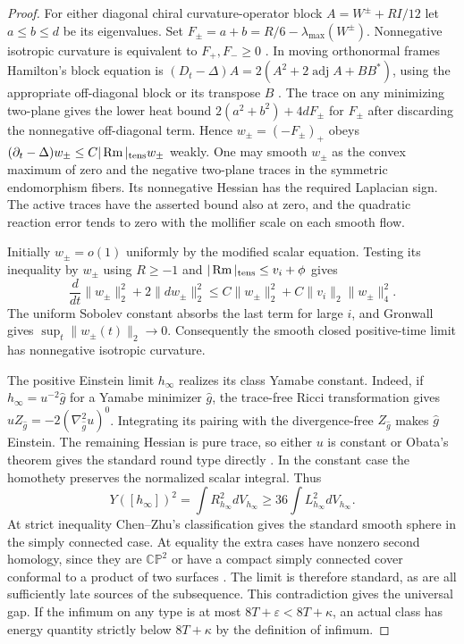 \begin{proof}
For either diagonal chiral curvature-operator block
\(A=W^\pm+RI/12\) let \(a\le b\le d\) be its eigenvalues.
Set \(F_\pm=a+b=R/6-\lambda_{\max}(W^\pm)\). Nonnegative
isotropic curvature is equivalent to \(F_+,F_-\ge0\)
\cite[Section~3, (3.1)--(3.2)]{ChenZhu2014Conformal}.
In moving orthonormal frames Hamilton's block equation is
\((D_t-\Delta)A=2(A^2+2\operatorname{adj}A+BB^*)\), using
the appropriate off-diagonal block or its transpose \(B\)
\cite[Section~2, pp.~157--158]{Hamilton1986}.
The trace on any minimizing two-plane gives the lower heat
bound \(2(a^2+b^2)+4dF_\pm\) for \(F_\pm\) after discarding
the nonnegative off-diagonal term. Hence \(w_\pm=(-F_\pm)_+\)
obeys \((\partial_t-\Delta)w_\pm\le C|\operatorname{Rm}|_{\rm tens}w_\pm\)
weakly. One may smooth \(w_\pm\) as the convex maximum of zero
and the negative two-plane traces in the symmetric endomorphism
fibers. Its nonnegative Hessian has the required Laplacian sign.
The active traces have the asserted bound also at zero, and
the quadratic reaction error tends to zero with the mollifier
scale on each smooth flow.

Initially \(w_\pm=o(1)\) uniformly by the modified scalar
equation. Testing its inequality by \(w_\pm\) using \(R\ge-1\)
and \(|\operatorname{Rm}|_{\rm tens}\le v_i+\phi\) gives
\[
 \frac d{dt}\|w_\pm\|_2^2+2\|dw_\pm\|_2^2
 \le C\|w_\pm\|_2^2+C\|v_i\|_2\|w_\pm\|_4^2.
\]
The uniform Sobolev constant absorbs the last term for large
\(i\), and Gronwall gives \(\sup_t\|w_\pm(t)\|_2\to0\).
Consequently the smooth closed positive-time limit has
nonnegative isotropic curvature.

The positive Einstein limit \(h_\infty\) realizes its class Yamabe
constant. Indeed, if \(h_\infty=u^{-2}\widehat g\) for a Yamabe
minimizer \(\widehat g\), the trace-free Ricci transformation gives
\(u Z_{\widehat g}=-2(\nabla^2_{\widehat g}u)^0\). Integrating its
pairing with the divergence-free \(Z_{\widehat g}\) makes \(\widehat g\)
Einstein. The remaining Hessian is pure trace, so either \(u\) is
constant or Obata's theorem gives the standard round type directly
\cite{Obata1962Sphere}. In the constant case the homothety
preserves the normalized scalar integral. Thus
\[
 Y([h_\infty])^2=\int R_{h_\infty}^2dV_{h_\infty}
 \ge36\int L_{h_\infty}^2dV_{h_\infty}.
\]
At strict inequality Chen--Zhu's classification gives the
standard smooth sphere in the simply connected case. At equality
the extra cases have nonzero second homology, since they are
\(\mathbb{CP}^2\) or have a compact simply connected cover
conformal to a product of two surfaces
\cite[Theorems~1.4 and 1.6]{ChenZhu2014Conformal}. The limit is
therefore standard, as are all sufficiently late sources of the
subsequence. This contradiction gives the universal gap. If
the infimum on any type is at most \(8T+\varepsilon<8T+\kappa\),
an actual class has energy quantity strictly below \(8T+\kappa\)
by the definition of infimum.
\end{proof}

